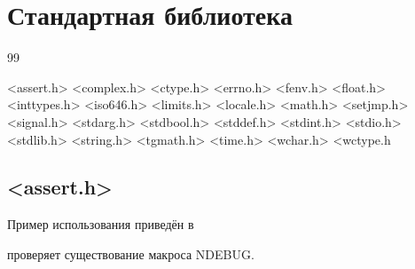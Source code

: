 \documentclass[myc.tex]{subfiles}
\begin{document}
\chapter{Стандартная библиотека}

99

<assert.h>
<complex.h>
<ctype.h>
<errno.h>
<fenv.h>
<float.h>
<inttypes.h>
<iso646.h>
<limits.h>
<locale.h>
<math.h>
<setjmp.h>
<signal.h>
<stdarg.h>
<stdbool.h>
<stddef.h>
<stdint.h>
<stdio.h>
<stdlib.h>
<string.h>
<tgmath.h>
<time.h>
<wchar.h>
<wctype.h

\section{<assert.h>}
Пример использования приведён в %

проверяет существование макроса NDEBUG.



\end{document}
